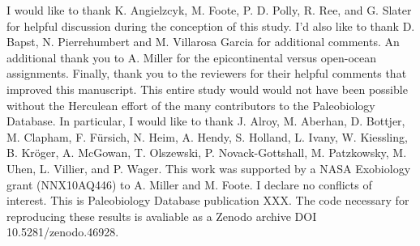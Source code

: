 \documentclass[11pt]{article}
\begin{document}
I would like to thank K. Angielzcyk, M. Foote, P. D. Polly, R. Ree, and G. Slater for helpful discussion during the conception of this study. I'd also like to thank D. Bapst, N. Pierrehumbert and M. Villarosa Garcia for additional comments. An additional thank you to  A. Miller for the epicontinental versus open-ocean assignments. Finally, thank you to the reviewers for their helpful comments that improved this manuscript. This entire study would would not have been possible without the Herculean effort of the many contributors to the Paleobiology Database. In particular, I would like to thank J. Alroy, M. Aberhan, D. Bottjer, M. Clapham, F. F\"{u}rsich, N. Heim, A. Hendy, S. Holland, L. Ivany, W. Kiessling, B. Kr\"{o}ger, A. McGowan, T. Olszewski, P. Novack-Gottshall, M. Patzkowsky, M. Uhen, L. Villier, and P. Wager. This work was supported by a NASA Exobiology grant (NNX10AQ446) to A. Miller and M. Foote. I declare no conflicts of interest. This is Paleobiology Database publication XXX. The code necessary for reproducing these results is avaliable as a Zenodo archive DOI 10.5281/zenodo.46928.

\newpage{}




\end{document}
